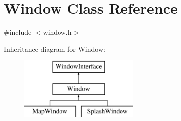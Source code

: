 \hypertarget{classWindow}{\section{Window Class Reference}
\label{classWindow}
}


{\ttfamily \#include $<$window.\-h$>$}

Inheritance diagram for Window\-:\begin{figure}[H]
\begin{center}
\leavevmode
\includegraphics[height=3.000000cm]{classWindow}
\end{center}
\end{figure}
